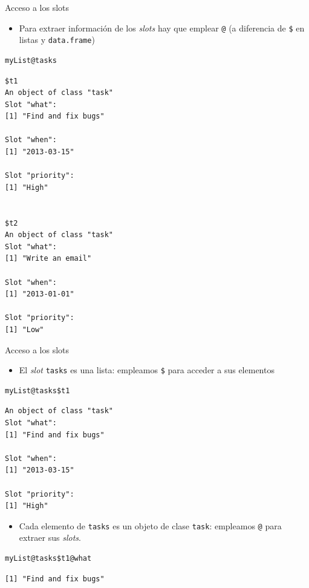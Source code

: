 \documentclass[xcolor={usenames,svgnames,dvipsnames}]{beamer}
\begin{document}
\begin{frame}[fragile,label={sec:orgheadline26}]{Acceso a los slots}
 \begin{itemize}
\item Para extraer información de los \emph{slots} hay que emplear \texttt{@} (a
diferencia de \texttt{\$} en listas y \texttt{data.frame})
\end{itemize}
\lstset{language=R,label= ,caption= ,captionpos=b,numbers=none}
\begin{lstlisting}
myList@tasks
\end{lstlisting}

\begin{verbatim}
$t1
An object of class "task"
Slot "what":
[1] "Find and fix bugs"

Slot "when":
[1] "2013-03-15"

Slot "priority":
[1] "High"


$t2
An object of class "task"
Slot "what":
[1] "Write an email"

Slot "when":
[1] "2013-01-01"

Slot "priority":
[1] "Low"
\end{verbatim}
\end{frame}

\begin{frame}[fragile,label={sec:orgheadline27}]{Acceso a los slots}
 \begin{itemize}
\item El \emph{slot} \texttt{tasks} es una lista: empleamos \texttt{\$} para acceder a sus elementos
\end{itemize}
\lstset{language=R,label= ,caption= ,captionpos=b,numbers=none}
\begin{lstlisting}
myList@tasks$t1
\end{lstlisting}

\begin{verbatim}
An object of class "task"
Slot "what":
[1] "Find and fix bugs"

Slot "when":
[1] "2013-03-15"

Slot "priority":
[1] "High"
\end{verbatim}

\begin{itemize}
\item Cada elemento de \texttt{tasks} es un objeto de clase \texttt{task}: empleamos
\texttt{@} para extraer sus \emph{slots}.
\end{itemize}
\lstset{language=R,label= ,caption= ,captionpos=b,numbers=none}
\begin{lstlisting}
myList@tasks$t1@what
\end{lstlisting}

\begin{verbatim}
[1] "Find and fix bugs"
\end{verbatim}
\end{frame}
\end{document}
